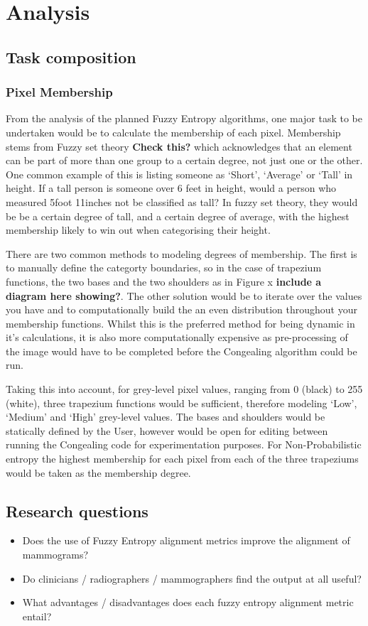 \section{Analysis}

\subsection{Task composition}

\subsubsection{Pixel Membership}

From the analysis of the planned Fuzzy Entropy algorithms, one major task to be undertaken would be to calculate the membership of each pixel. Membership stems from Fuzzy set theory \textbf{Check this?} which acknowledges that an element can be part of more than one group to a certain degree, not just one or the other. One common example of this is listing someone as `Short', `Average' or `Tall' in height. If a tall person is someone over 6 feet in height, would a person who measured 5foot 11inches not be classified as tall? In fuzzy set theory, they would be be a certain degree of tall, and a certain degree of average, with the highest membership likely to win out when categorising their height.

There are two common methods to modeling degrees of membership. The first is to manually define the categorty boundaries, so in the case of trapezium functions, the two bases and the two shoulders as in Figure x \textbf{include a diagram here showing?}. The other solution would be to iterate over the values you have and to computationally build the an even distribution throughout your membership functions. Whilst this is the preferred method for being dynamic in it's calculations, it is also more computationally expensive as pre-processing of the image would have to be completed before the Congealing algorithm could be run.

Taking this into account, for grey-level pixel values, ranging from 0 (black) to 255 (white), three trapezium functions would be sufficient, therefore modeling `Low', `Medium' and `High' grey-level values. The bases and shoulders would be statically defined by the User, however would be open for editing between running the Congealing code for experimentation purposes. For Non-Probabilistic entropy the highest membership for each pixel from each of the three trapeziums would be taken as the membership degree.

\subsection{Research questions}
\begin{itemize}
\item Does the use of Fuzzy Entropy alignment metrics improve the alignment of mammograms?
\item Do clinicians / radiographers / mammographers find the output at all useful?
\item What advantages / disadvantages does each fuzzy entropy alignment metric entail?
\end{itemize}
